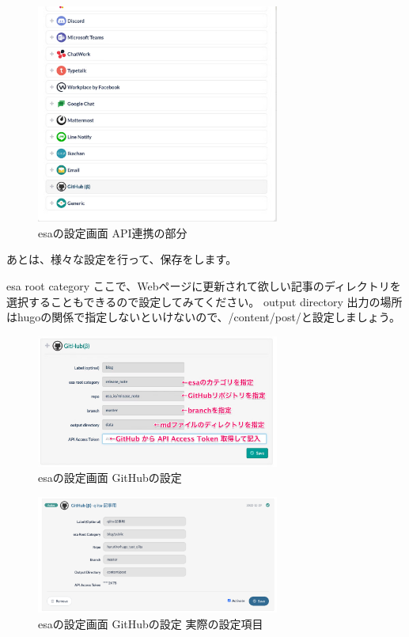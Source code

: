   \begin{figure}[H]
    \centering
    \includegraphics[width=8cm]{./image/02-chap7/esa-setting-list.png}
    \caption{esaの設定画面 API連携の部分 }
    \label{chap7-esa-setting-list-image}
  \end{figure}

  あとは、様々な設定を行って、保存をします。

  esa root category
  ここで、Webページに更新されて欲しい記事のディレクトリを選択することもできるので設定してみてください。
  output directory
  出力の場所はhugoの関係で指定しないといけないので、/content/post/と設定しましょう。

  \begin{figure}[H]
    \centering
    \includegraphics[width=8cm]{./image/02-chap7/github-setting.png}
    \caption{esaの設定画面 GitHubの設定 }
    \label{chap7-github-setting-image}
  \end{figure}

  \begin{figure}[H]
    \centering
    \includegraphics[width=8cm]{./image/02-chap7/github-setting-writed.png}
    \caption{esaの設定画面 GitHubの設定 実際の設定項目 }
    \label{chap7-github-setting-writed-image}
  \end{figure}

